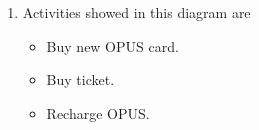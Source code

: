 \documentclass[a4paper,12pt]{article}
\begin{document}
\begin{enumerate}
\item Activities showed in this diagram are\
\begin{itemize}
    \item Buy new OPUS card.
    \item Buy ticket.
    \item Recharge OPUS.
\end{itemize}
\begin{center}
\end{center}


\end{enumerate}
\end{document}

